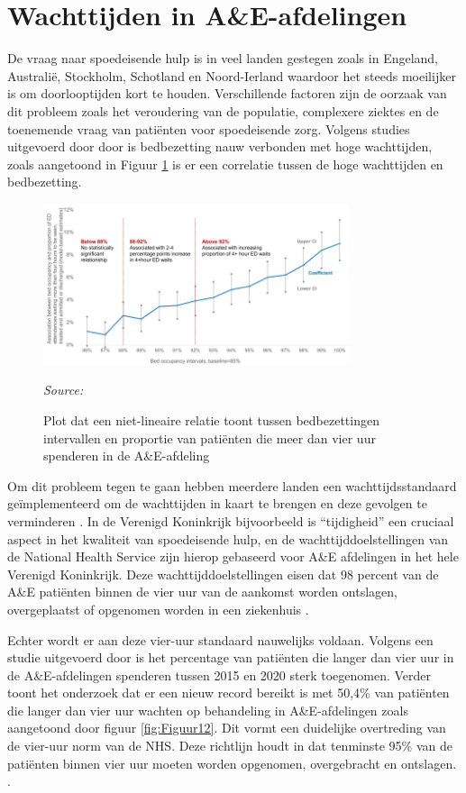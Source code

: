 \section{Wachttijden in A\&E-afdelingen}
De vraag naar spoedeisende hulp is in veel landen gestegen zoals in Engeland,
Australië, Stockholm, Schotland en Noord-Ierland waardoor het steeds moeilijker is om doorlooptijden kort te houden. Verschillende factoren zijn de oorzaak van dit probleem zoals het veroudering van de populatie, complexere ziektes en de toenemende vraag van patiënten voor spoedeisende zorg. Volgens studies uitgevoerd door \autocite{Paling2020, Friebel2020} door is bedbezetting nauw verbonden met hoge wachttijden, zoals aangetoond in Figuur \ref{fig:Figuur11} is er een correlatie tussen de hoge wachttijden en bedbezetting.

\begin{figure}[h]
    \centering
    \includegraphics[width=0.80\textwidth]{img/bp/bed-occupancy.png}
    \caption{Plot dat een niet-lineaire relatie toont tussen bedbezettingen intervallen en proportie van patiënten die meer dan vier uur spenderen in de A\&E-afdeling}
    \label{fig:Figuur11}
    \textit{Source: \autocite{Paling2020}}
\end{figure}

Om dit probleem tegen te gaan hebben meerdere landen een wachttijdsstandaard geïmplementeerd om de wachttijden in kaart te brengen en deze gevolgen te verminderen \autocite{Paling2020}. In de Verenigd Koninkrijk bijvoorbeeld is “tijdigheid” een cruciaal aspect in het kwaliteit van spoedeisende hulp, en de wachttijddoelstellingen van de National Health Service zijn hierop gebaseerd voor A\&E afdelingen in het hele Verenigd Koninkrijk. Deze wachttijddoelstellingen eisen dat 98 percent van de A\&E patiënten binnen de vier uur van de aankomst worden ontslagen, overgeplaatst of opgenomen worden in een ziekenhuis \autocite{Mayhew2008, Izady2012}. 


Echter wordt er aan deze vier-uur standaard nauwelijks voldaan. Volgens een studie uitgevoerd door \autocite{Baker2024} is het percentage van patiënten die langer dan vier uur in de A\&E-afdelingen spenderen tussen 2015 en 2020 sterk toegenomen. Verder toont het onderzoek dat er een nieuw record bereikt is met 50,4\% van patiënten die langer dan vier uur wachten op behandeling in A\&E-afdelingen zoals aangetoond door figuur \ref{fig:Figuur12}. Dit vormt een duidelijke overtreding van de vier-uur norm van de NHS. Deze richtlijn houdt in dat tenminste 95\% van de patiënten binnen vier uur moeten worden opgenomen, overgebracht en ontslagen. \autocite{NationalStatisticsONS2024}.

